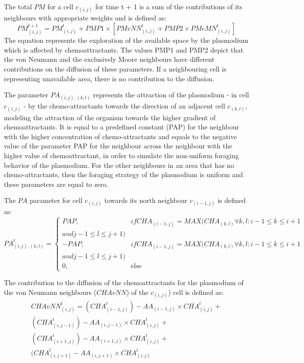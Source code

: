 The total $PM$ for a cell $c_{(i,j)}$ for time t + 1 is a sum of the contributions of its neighbours with appropriate weights and is defined as:
\begin{equation}
PM^{t+1}_{(i, j)} = PM^t_{(i, j)} + PMP1 \times [PMvNN^t_{(i, j)} + PMP2 \times PMeMN^t_{(i, j)}]
\end{equation}
The equation represents the exploration of the available space by the plasmodium which is affected by chemoattractants. The values PMP1 and PMP2 depict that the von Neumann and the exclusively Moore neighbours have different contributions on the diffusion of these parameters. If a neighbouring cell is representing unavailable area, there is no contribution to the diffusion.
 
\par
The parameter $PA_{(i, j),(k,l)}$ represents the attraction of the plasmodium - in cell $c_{(i,j)}$ - by the chemo-attractants towards the direction of an adjacent cell $c_{(k,l)}$, modeling the attraction of the organism towards the higher gradient of chemoattractants. It is equal to a predefined constant (PAP) for the neighbour with the higher concentration of chemo-attractants and equals to the negative value of the parameter PAP for the neighbour across the neighbour with the higher value of chemoattractant, in order to simulate the non-uniform foraging behavior of the plasmodium. For the other neighbours in an area that has no chemo-attractants, then the foraging strategy of the plasmodium is uniform and these parameters are equal to zero.

\par
The $PA$ parameter for cell $c_{(i,j)}$ towards its north neighbour $c_{(i-1,j)}$ is defined as:
\begin{equation}
PA^t_{(i, j),(k,l)}=
\begin{cases} 
PAP, & if CHA_{(i-1, j)} = MAX(CHA_{(k, l)} \forall k, l: i - 1 \leq k \leq i + 1 \\and j - 1 \leq l \leq j+1) \\ 
- PAP, & if CHA_{(i-1, j)} = MAX(CHA_{(k, l)} \forall k, l: i - 1 \leq k \leq i + 1 \\and j - 1 \leq l \leq j+1) \\ 
0, & \mbox{else}
\end{cases}
\end{equation}

\par
The contribution to the diffusion of the chemoattractants for the plasmodium of the von Neumann neighbours ($CHAvNN$) of the $c_{(i,j)}$) cell is defined as:
\begin{equation}
\begin{split}
CHAvNN^t_{(i, j)} = 
(CHA^t_{(i-1, j)}) - AA_{(i-1, j)} \times CHA^t_{(i, j)} +
\\(CHA^t_{(i, j-1)}) - AA_{(i, j-1)} \times CHA^t_{(i, j)} +
\\(CHA^t_{(i+1, j)}) - AA_{(i+1, j)} \times CHA^t_{(i, j)}  +
\\(CHA^t_{(i, j+1)} - AA_{(i, j+1)} \times CHA^t_{(i, j)}
\end{split}
\end{equation}

